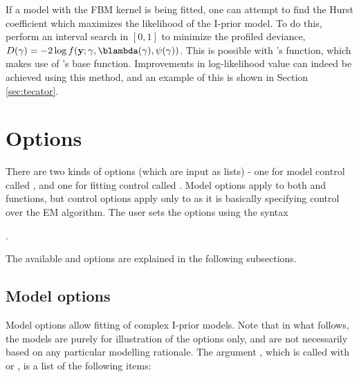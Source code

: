 If a model with the FBM kernel is being fitted, one can attempt to find the Hurst coefficient which maximizes the likelihood of the I-prior model. To do this, perform an interval search in $[0,1]$ to minimize the profiled deviance, $D(\gamma) = -2 \log f(\mathbf y; \gamma, \blambda(\gamma), \psi(\gamma))$. This is possible with 's  function, which makes use of 's base  function. Improvements in log-likelihood value can indeed be achieved using this method, and an example of this is shown in Section \ref{sec:tecator}.

\section{Options}
\label{sec:options}

There are two kinds of options (which are input as lists) - one for model control called , and one for fitting control called . Model options apply to both  and  functions, but control options apply only to  as it is basically specifying control over the EM algorithm. The user sets the options using the syntax
\begin{center}
.
\end{center}
The available  and  options are explained in the following subsections.

\subsection{Model options}

Model options allow fitting of complex I-prior models. Note that in what follows, the models are purely for illustration of the  options only, and are not necessarily based on any particular modelling rationale. The argument , which is called with  or , is a list of the following items:

